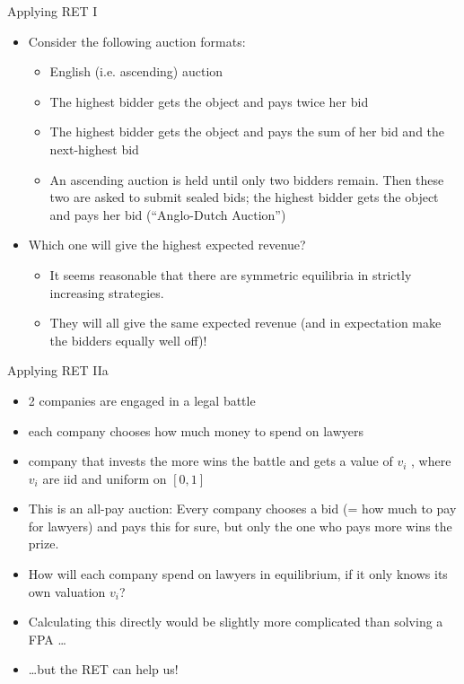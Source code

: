 \documentclass[bigger]{beamer}
\begin{document}
\begin{frame}[label={sec:org1552da2}]{Applying RET I}
\begin{itemize}
\item Consider the following auction formats:
\begin{itemize}
\item English (i.e. ascending) auction
\item The highest bidder gets the object and pays twice her bid
\item The highest bidder gets the object and pays the sum of her bid and the next-highest bid
\item An ascending auction is held until only two bidders remain. Then these two are asked to submit sealed bids; the highest bidder gets the object and pays her bid (“Anglo-Dutch Auction”)
\end{itemize}
\item Which one will give the highest expected revenue?
\pause
\begin{itemize}
\item It seems reasonable that there are symmetric equilibria in strictly increasing strategies.
\item They will all give the same expected revenue (and in expectation make the bidders equally well off)!
\end{itemize}
\end{itemize}
\end{frame}

\begin{frame}[label={sec:org87f1b85}]{Applying RET IIa}
\begin{itemize}
\item 2 companies are engaged in a legal battle
\item each company chooses how much money to spend on lawyers
\item company that invests the more wins the battle and gets a value of \(v_i\) , where \(v_i\) are iid and uniform on \([0,1]\)
\item This is an all-pay auction: Every company chooses a bid (= how much to pay for lawyers) and pays this for sure, but only the one who pays more wins the prize.
\item How will each company spend on lawyers in equilibrium, if it only knows its own valuation \(v_i\)?
\item Calculating this directly would be slightly more complicated than solving a FPA \ldots{}
\item \ldots{}but the RET can help us!
\end{itemize}
\end{frame}
\end{document}
